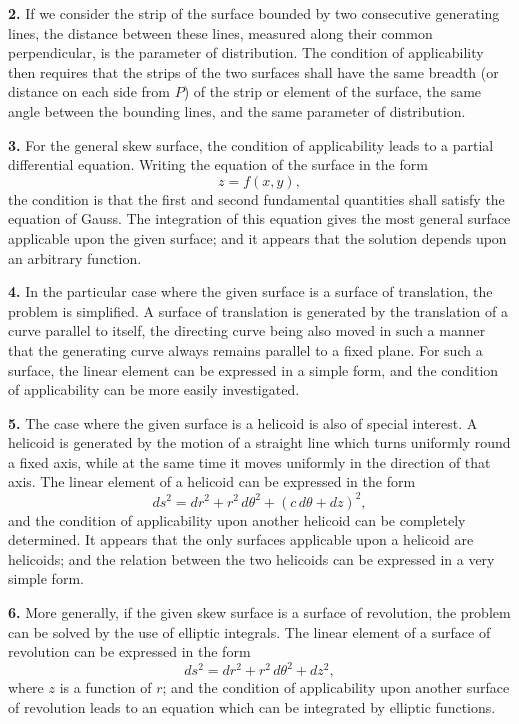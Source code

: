 \documentclass[11pt,a4paper]{book}
\begin{document}
\textbf{2.} If we consider the strip of the surface bounded by two consecutive
generating lines, the distance between these lines, measured along their common
perpendicular, is the parameter of distribution. The condition of applicability
then requires that the strips of the two surfaces shall have the same breadth (or
distance on each side from $P$) of the strip or element of the surface, the same
angle between the bounding lines, and the same parameter of distribution.

\textbf{3.} For the general skew surface, the condition of applicability leads to a
partial differential equation. Writing the equation of the surface in the form
\[
z = f(x, y),
\]
the condition is that the first and second fundamental quantities shall satisfy the
equation of Gauss. The integration of this equation gives the most general
surface applicable upon the given surface; and it appears that the solution depends
upon an arbitrary function.

\textbf{4.} In the particular case where the given surface is a surface of translation,
the problem is simplified. A surface of translation is generated by the translation
of a curve parallel to itself, the directing curve being also moved in such a manner
that the generating curve always remains parallel to a fixed plane. For such a
surface, the linear element can be expressed in a simple form, and the condition of
applicability can be more easily investigated.

\textbf{5.} The case where the given surface is a helicoid is also of special interest.
A helicoid is generated by the motion of a straight line which turns uniformly
round a fixed axis, while at the same time it moves uniformly in the direction of
that axis. The linear element of a helicoid can be expressed in the form
\[
ds^2 = dr^2 + r^2\,d\theta^2 + (c\,d\theta + dz)^2,
\]
and the condition of applicability upon another helicoid can be completely
determined. It appears that the only surfaces applicable upon a helicoid are
helicoids; and the relation between the two helicoids can be expressed in a very
simple form.

\textbf{6.} More generally, if the given skew surface is a surface of revolution,
the problem can be solved by the use of elliptic integrals. The linear element of
a surface of revolution can be expressed in the form
\[
ds^2 = dr^2 + r^2\,d\theta^2 + dz^2,
\]
where $z$ is a function of $r$; and the condition of applicability upon another surface
of revolution leads to an equation which can be integrated by elliptic functions.
\end{document}
